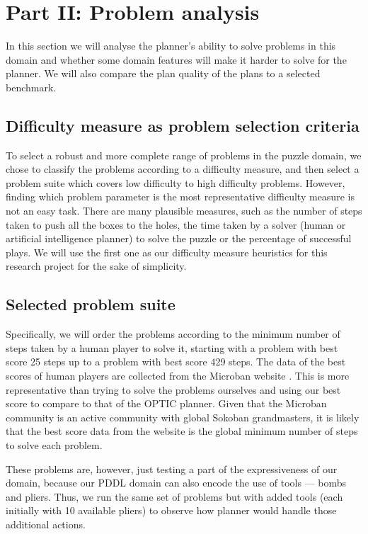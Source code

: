 \documentclass[letterpaper]{article} %
\begin{document}
\section{Part II: Problem analysis}
In this section we will analyse the planner's ability to solve problems in this domain and whether some domain features will
make it harder to solve for the planner. We will also compare the plan quality of the plans to a selected benchmark.

\subsection{Difficulty measure as problem selection criteria}
To select a robust and more complete range of problems in the puzzle domain, we chose to classify the problems according
 to a difficulty measure, and then select a problem suite which covers low difficulty to high difficulty problems. 
 However, finding which problem parameter is the most representative difficulty measure is not an easy task. There are many plausible measures, such as
  the number of steps taken to push all the boxes to the holes, the time taken by a solver (human or artificial 
  intelligence planner) to solve the puzzle or the percentage of successful plays. We will use the first one as our 
  difficulty measure heuristics for this research project for the sake of simplicity.

\subsection{Selected problem suite}
Specifically, we will order the problems according to the
minimum number of steps
taken by a human player to solve it, starting with a 
problem with best score 25 steps up to a problem with 
best score 429 steps. The data of the best scores of
human players are collected from the Microban website \cite{microban}. 
This is more representative than trying to solve the 
problems ourselves and using our best score to compare 
to that of the OPTIC planner. Given that the Microban 
community is an active community with global Sokoban 
grandmasters, it is likely that the best score data 
from the website is the global minimum number of steps
to solve each problem. 
   
These problems are, however, just testing a part of
the expressiveness of our domain, because our PDDL
domain can also encode the use of tools --- 
bombs and pliers. Thus, we run the same set 
of problems but with added tools (each initially 
with 10 available pliers) to observe how planner 
would handle those additional actions. 
\end{document}
